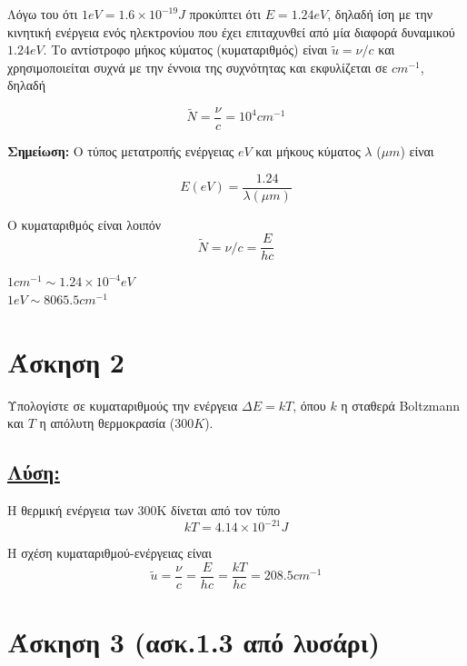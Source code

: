 \documentclass[a4paper,11pt,titlepage]{article}
\numberwithin{equation}{section} %
\begin{document}
Λόγω του ότι $1eV=1.6\times10^{-19}J$ προκύπτει ότι $E=1.24eV$, δηλαδή ίση με την κινητική ενέργεια ενός ηλεκτρονίου που έχει επιταχυνθεί  από μία διαφορά δυναμικού $1.24eV$. Το αντίστροφο μήκος κύματος (κυματαριθμός) είναι $\widetilde{u}=\nu/c$ και χρησιμοποιείται συχνά με την έννοια της συχνότητας και εκφυλίζεται σε $cm^{-1}$, δηλαδή  

\begin{equation}
\widetilde{N}=\frac{\nu}{c}=10^4cm^{-1} 
\end{equation}

\textbf{Σημείωση:} Ο τύπος μετατροπής ενέργειας $eV$ και μήκους κύματος $\lambda$ (${\mu}m$) είναι

\begin{equation}
 E(eV)=\frac{1.24}{\lambda({\mu}m)}
\end{equation}

Ο κυματαριθμός είναι λοιπόν
\begin{equation}
 \widetilde{N}=\nu/c=\frac{E}{hc}
\end{equation}

$1cm^{-1}\sim1.24\times10^{-4}eV$\\ $1eV\sim8065.5 cm^{-1}$

\newpage
\section{Άσκηση 2}

Υπολογίστε σε κυματαριθμούς την ενέργεια ${\Delta}E=kT$, όπου $k$ η σταθερά Boltzmann και $T$ η απόλυτη θερμοκρασία ($300K$).

\subsection*{\underline{Λύση:}}

Η θερμική ενέργεια των 300K δίνεται από τον τύπο
\begin{equation}
 kT=4.14\times10^{-21} J
\end{equation}

Η σχέση κυματαριθμού-ενέργειας είναι
\begin{equation}
 \widetilde{u}=\frac{\nu}{c}=\frac{E}{hc}=\frac{kT}{hc}=208.5 cm^{-1}
\end{equation}

\section{Άσκηση 3 (ασκ.1.3 από λυσάρι)}
\end{document}
